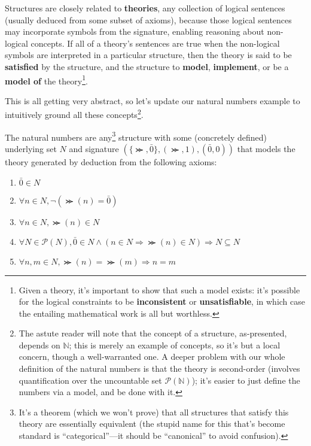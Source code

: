 Structures are closely related to \textbf{theories}, any collection of logical sentences (usually deduced from some subset of axioms),
because those logical sentences may incorporate symbols from the signature, enabling reasoning about non-logical concepts.
If all of a theory's sentences are true when the non-logical symbols are interpreted in a particular structure,
then the theory is said to be \textbf{satisfied} by the structure, and the structure to \textbf{model}, \textbf{implement},
or be a \textbf{model of} the theory\footnote
{
  Given a theory, it's important to show that such a model exists: it's possible for the logical constraints to be \textbf{inconsistent}
  or \textbf{unsatisfiable}, in which case the entailing mathematical work is all but worthless.
}.

This is all getting very abstract, so let's update our natural numbers example to intuitively ground all these concepts\footnote
{
  The astute reader will note that the concept of a structure, as-presented, depends on $\mathbb{N}$; this is merely an example of concepts,
  so it's but a local concern, though a well-warranted one.
  A deeper problem with our whole definition of the natural numbers is that the theory is second-order
  (involves quantification over the uncountable set $\mathcal{P}(\mathbb{N})$); it's easier to just define the numbers via a model,
  and be done with it.
}.

\begin{definition}
  The natural numbers are any\footnote
  {
    It's a theorem (which we won't prove) that all structures that satisfy this theory are essentially equivalent
    (the stupid name for this that's become standard is ``categorical''---it should be ``canonical'' to avoid confusion).
  }
  structure with some (concretely defined) underlying set ${N}$ and signature $(\{\Succ, \bar{0}\}, {(\Succ, 1), (\bar{0}, 0)})$
  that models the theory generated by deduction from the following axioms:
  \begin{enumerate}
  \item $\bar{0} \in {N}$
  \item $\forall n \in {N}, \lnot(\Succ(n) = \bar{0})$
  \item $\forall n \in {N}, \Succ(n) \in {N}$
  \item $\forall N \in \mathcal{P}({N}), \bar{0} \in N \land (n \in N \Rightarrow \Succ(n) \in N) \Rightarrow {N} \subseteq N$
  \item $\forall n,m \in {N}, \Succ(n) = \Succ(m) \Rightarrow n = m$
  \end{enumerate}
\end{definition}

